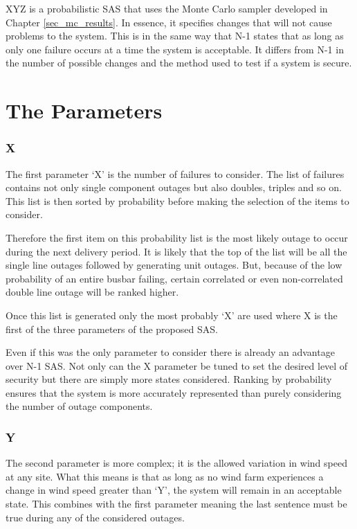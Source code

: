 \documentclass[a4paper,oneside,12pt]{report}
\begin{document}
XYZ is a probabilistic SAS that uses the Monte Carlo sampler developed in Chapter \ref{sec_mc_results}. In essence, it specifies changes that will not cause problems to the system. This is in the same way that N-1 states that as long as only one failure occurs at a time the system is acceptable. It differs from N-1 in the number of possible changes and the method used to test if a system is secure.

\section{The Parameters}

\subsubsection{X}

The first parameter `X' is the number of failures to consider. The list of failures contains not only single component outages but also doubles, triples and so on. This list is then sorted by probability before making the selection of the items to consider.

Therefore the first item on this probability list is the most likely outage to occur during the next delivery period. It is likely that the top of the list will be all the single line outages followed by generating unit outages. But, because of the low probability of an entire busbar failing, certain correlated or even non-correlated double line outage will be ranked higher.

Once this list is generated only the most probably `X' are used where X is the first of the three parameters of the proposed SAS.

Even if this was the only parameter to consider there is already an advantage over N-1 SAS. Not only can the X parameter be tuned to set the desired level of security but there are simply more states considered. Ranking by probability ensures that the system is more accurately represented than purely considering the number of outage components.

\subsubsection{Y}

The second parameter is more complex; it is the allowed variation in wind speed at any site. What this means is that as long as no wind farm experiences a change in wind speed greater than `Y', the system will remain in an acceptable state. This combines with the first parameter meaning the last sentence must be true during any of the considered outages.
\end{document}
